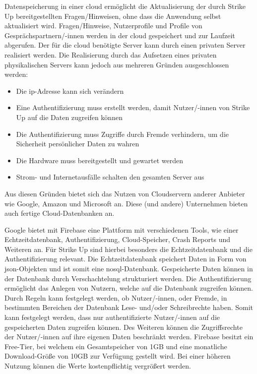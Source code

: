 Datenspeicherung in einer \gls{cloud} ermöglicht die Aktualisierung der durch Strike Up bereitgestellten Fragen/Hinweisen, ohne dass die Anwendung selbst aktualisiert wird. Fragen/Hinweise,
Nutzerprofile und Profile von Gesprächspartnern/-innen werden in der \gls{cloud} gespeichert und zur Laufzeit abgerufen. \newline
Der für die \gls{cloud} benötigte Server kann durch einen privaten Server realisiert werden. Die Realisierung durch das Aufsetzen eines privaten physikalischen Servers kann jedoch aus
mehreren Gründen ausgeschlossen werden:
\begin{itemize}
    \item Die \gls{ip}-Adresse kann sich verändern
    \item Eine Authentifizierung muss erstellt werden, damit Nutzer/-innen von Strike Up auf die Daten zugreifen können
    \item Die Authentifizierung muss Zugriffe durch Fremde verhindern, um die Sicherheit persönlicher Daten zu wahren
    \item Die Hardware muss bereitgestellt und gewartet werden
    \item Strom- und Internetausfälle schalten den gesamten Server aus
\end{itemize}
Aus diesen Gründen bietet sich das Nutzen von Cloudservern anderer Anbieter wie Google, Amazon und Microsoft an. Diese (und andere) Unternehmen bieten auch fertige Cloud-Datenbanken an.

Google bietet mit Firebase \cite{misc:firebase} eine Plattform mit verschiedenen Tools, wie einer Echtzeitdatenbank, Authentifizierung, Cloud-Speicher, Crash Reports und Weiteren an.
Für Strike Up sind hierbei besonders die Echtzeitdatenbank und die Authentifizierung relevant. Die Echtzeitdatenbank speichert Daten in Form von \gls{json}-Objekten und ist somit
eine \gls{nosql}-Datenbank. Gespeicherte Daten können in der Datenbank durch Verschachtelung strukturiert werden. Die Authentifizierung ermöglicht das Anlegen von Nutzern, welche auf die
Datenbank zugreifen können. Durch Regeln kann festgelegt werden, ob Nutzer/-innen, oder Fremde, in bestimmten Bereichen der Datenbank Lese- und/oder Schreibrechte haben. Somit kann festgelegt werden,
dass nur authentifizierte Nutzer/-innen auf die gespeicherten Daten zugreifen können. Des Weiteren können die Zugriffsrechte der Nutzer/-innen auf ihre eigenen Daten beschränkt werden. \newline
Firebase besitzt ein Free-Tier, bei welchem ein Gesamtspeicher von 1GB und eine monatliche Download-Größe von 10GB zur Verfügung gestellt wird. Bei einer höheren Nutzung können die Werte
kostenpflichtig vergrößert werden.

